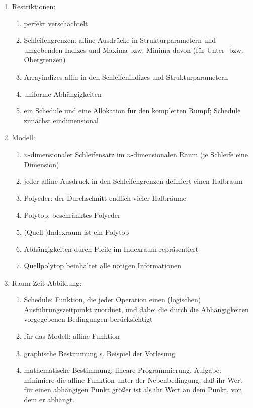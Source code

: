 \begin{enumerate}
\item Restriktionen:
\begin{enumerate}
\item perfekt verschachtelt
\item Schleifengrenzen: affine Ausdrücke in Strukturparametern und umgebenden
  Indizes und Maxima bzw. Minima davon (für Unter- bzw. Obergrenzen)
\item Arrayindizes affin in den Schleifenindizes und Strukturparametern
\item uniforme Abhängigkeiten
\item ein Schedule und eine Allokation für den kompletten Rumpf;
  Schedule zunächst eindimensional
\end{enumerate}
%
\item Modell:
\begin{enumerate}
\item $n$-dimensionaler Schleifensatz im $n$-dimensionalen Raum (je
  Schleife eine Dimension)
\item jeder affine Ausdruck in den Schleifengrenzen definiert einen
  Halbraum
\item Polyeder: der Durchschnitt endlich vieler Halbräume
\item Polytop: beschränktes Polyeder
\item (Quell-)Indexraum ist ein Polytop
\item Abhängigkeiten durch Pfeile im Indexraum repräsentiert
\item Quellpolytop beinhaltet alle nötigen Informationen
\end{enumerate}
%
\item Raum-Zeit-Abbildung:
\begin{enumerate}
\item Schedule: Funktion, die jeder Operation einen (logischen)
  Ausführungszeitpunkt zuordnet, und dabei die durch die Abhängigkeiten
  vorgegebenen Bedingungen berücksichtigt
\item für das Modell: affine Funktion
\item graphische Bestimmung s. Beispiel der Vorlesung
\item mathematische Bestimmung: lineare Programmierung. Aufgabe:
  minimiere die affine Funktion unter der Nebenbedingung, daß ihr Wert
  für einen abhängigen Punkt größer ist als ihr Wert an dem Punkt, von
  dem er abhängt.

\end{enumerate}
\end{enumerate}
